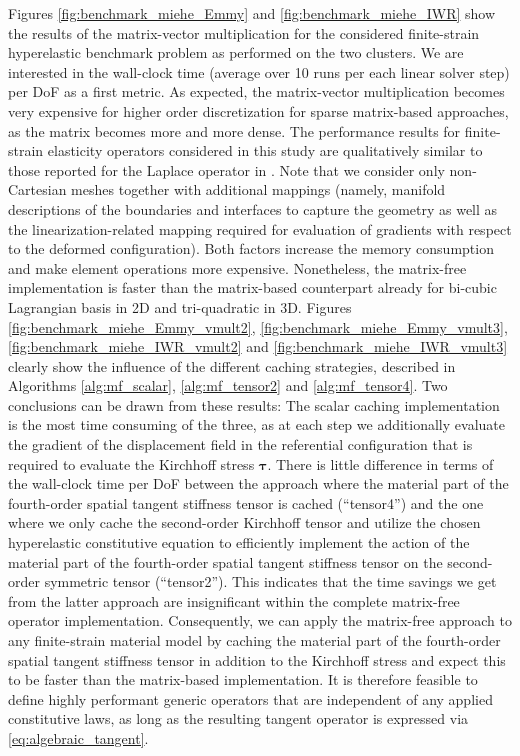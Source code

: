 \documentclass[times,doublespace]{nmeauth}
\newcommand*{\gz}[1]{\boldsymbol{#1}}
\begin{document}
Figures \ref{fig:benchmark_miehe_Emmy} and \ref{fig:benchmark_miehe_IWR} show the results of the matrix-vector multiplication for the considered finite-strain hyperelastic benchmark problem as performed on the two clusters.
We are interested in the wall-clock time (average over 10 runs per each linear solver step) per DoF as a first metric.
As expected, the matrix-vector multiplication becomes very expensive for higher order discretization for sparse matrix-based approaches,
as the matrix becomes more and more dense.
The performance results for finite-strain elasticity operators considered in this study are qualitatively similar to those reported for the Laplace operator in \cite{kronbichler12}.
Note that we consider only non-Cartesian meshes together with additional mappings (namely, manifold descriptions of the boundaries and interfaces \cite{Arndt2017a} to capture the geometry as well as
the linearization-related mapping required for evaluation of gradients with respect to the deformed configuration).
Both factors increase the memory consumption and make element operations more expensive.
Nonetheless,
the matrix-free implementation is faster than the matrix-based counterpart already for bi-cubic Lagrangian basis in 2D and tri-quadratic in 3D.
Figures \ref{fig:benchmark_miehe_Emmy_vmult2}, \ref{fig:benchmark_miehe_Emmy_vmult3}, \ref{fig:benchmark_miehe_IWR_vmult2} and \ref{fig:benchmark_miehe_IWR_vmult3} clearly show the influence of the different caching strategies,
described in Algorithms \ref{alg:mf_scalar}, \ref{alg:mf_tensor2} and \ref{alg:mf_tensor4}.
Two conclusions can be drawn from these results:
The scalar caching implementation is the most time consuming of the three, as at each step we additionally evaluate the gradient of the displacement field in the referential configuration that is required to evaluate the Kirchhoff stress $\gz \tau$.
There is little difference in terms of the wall-clock time per DoF between the approach where the material part of the fourth-order spatial tangent stiffness tensor is cached (``tensor4'') and the one where we only cache the second-order Kirchhoff tensor and utilize the chosen hyperelastic constitutive equation to efficiently implement the action of the material part of the fourth-order spatial tangent stiffness tensor on the second-order symmetric tensor (``tensor2'').
This indicates that the time savings we get from the latter approach are insignificant within the complete matrix-free operator implementation.
Consequently, we can apply the matrix-free approach to any finite-strain material model by caching the material part of the fourth-order spatial tangent stiffness tensor in addition to the Kirchhoff stress and expect this to be faster than the matrix-based implementation.
It is therefore feasible to define highly performant generic operators that are independent of any applied constitutive laws,
as long as the resulting tangent operator is expressed via \eqref{eq:algebraic_tangent}.
\end{document}
